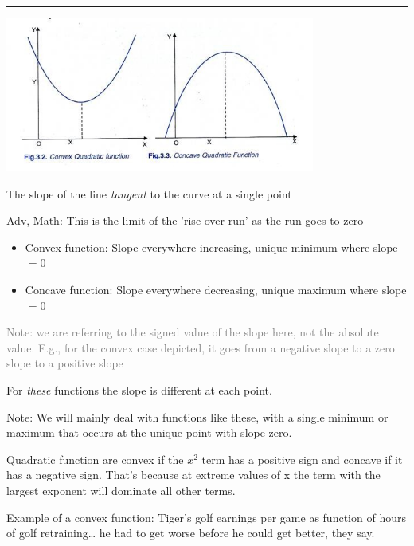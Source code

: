 \documentclass[]{article}
\providecommand{\tightlist}{%
  \setlength{\itemsep}{0pt}\setlength{\parskip}{0pt}}
\begin{document}
\begin{center}\rule{0.5\linewidth}{\linethickness}\end{center}

\includegraphics[height=2in]{picsfigs/concaveconvexquadratics.jpg}

\begin{description}
\tightlist
\item[Instantaneous rate of change (instantaneous slope)]
The slope of the line \emph{tangent} to the curve at a single point
\end{description}

\textcolor{RawSienna}{Adv, Math: This is the limit of the 'rise over run' as the run goes to zero}

\begin{itemize}
\item
  Convex function: Slope everywhere increasing, unique minimum where slope \(=0\)
\item
  Concave function: Slope everywhere decreasing, unique maximum where slope \(=0\)
\end{itemize}

\textcolor{gray}{Note: we are referring to the signed value of the slope here, not the absolute value. E.g., for the convex case depicted, it goes from a negative slope to a zero slope to a positive slope}

\bigskip

For \emph{these} functions the slope is different at each point.

Note: We will mainly deal with functions like these, with a single minimum or maximum that occurs at the unique point with slope zero.

Quadratic function are convex if the \(x^2\) term has a positive sign and concave if it has a negative sign.
That's because at extreme values of x the term with the largest exponent will dominate all other terms.

Example of a convex function: Tiger's golf earnings per game as function of hours of golf retraining\ldots{} he had to get worse before he could get better, they say.
\end{document}
